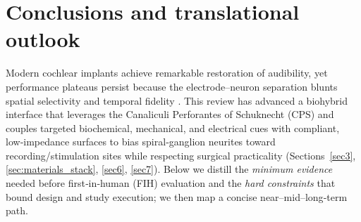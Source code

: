 \documentclass[referee,pdflatex, sn-vancouver-num]{sn-jnl}%
\theoremstyle{thmstyleone}%
\theoremstyle{thmstyletwo}%
\theoremstyle{thmstylethree}%
\begin{document}
\section{Conclusions and translational outlook}\label{sec8}
\noindent
Modern cochlear implants achieve remarkable restoration of audibility, yet performance plateaus persist because the electrode–neuron separation blunts spatial selectivity and temporal fidelity \cite{wilson2008,wilson2014,Micco2006}. This review has advanced a biohybrid interface that leverages the Canaliculi Perforantes of Schuknecht (CPS) and couples targeted biochemical, mechanical, and electrical cues with compliant, low‑impedance surfaces to bias spiral‑ganglion neurites toward recording/stimulation sites while respecting surgical practicality (Sections~\ref{sec3}, \ref{sec:materials_stack}, \ref{sec6}, \ref{sec7}). Below we distill the \emph{minimum evidence} needed before first‑in‑human (FIH) evaluation and the \emph{hard constraints} that bound design and study execution; we then map a concise near–mid–long‑term path.
\end{document}
